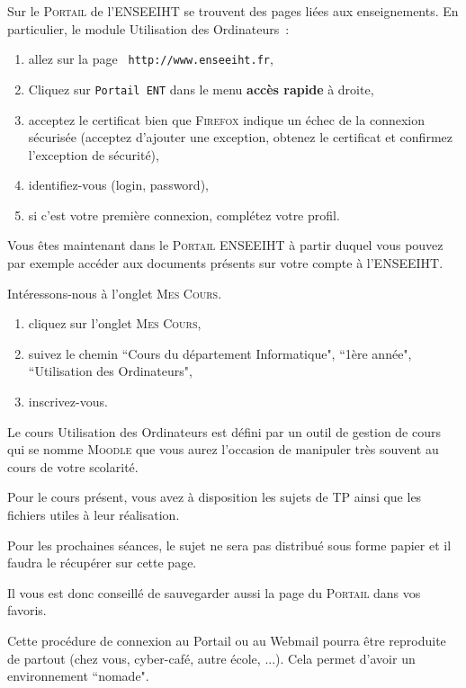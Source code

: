 \documentclass[a4paper,11pt]{article}
\newcommand{\netscape}{\textsc{Firefox}\xspace}
\begin{document}
Sur le \textsc{Portail} de l'ENSEEIHT se trouvent
des pages liées aux enseignements. En particulier, le module Utilisation des
Ordinateurs~:

\begin{enumerate}
  \item allez sur la page \verb+ http://www.enseeiht.fr+,
  \item Cliquez sur \verb+Portail ENT+ dans le menu \textbf{accès rapide} à
        droite,
  \item acceptez le certificat bien que \netscape indique un échec de la
        connexion sécurisée (acceptez d'ajouter une exception, obtenez le
        certificat et confirmez l'exception de sécurité),
  \item identifiez-vous (login, password),
  \item si c'est votre première connexion, complétez votre profil.
\end{enumerate}

Vous êtes maintenant dans le \textsc{Portail ENSEEIHT} à partir duquel vous
pouvez par exemple accéder aux documents présents sur votre compte à
l'ENSEEIHT.

Intéressons-nous à l'onglet \textsc{Mes Cours}.

\begin{enumerate}
  \item cliquez sur l'onglet \textsc{Mes Cours},
  \item suivez le chemin ``Cours du département
        Informatique", ``1ère année", ``Utilisation des Ordinateurs",
  \item inscrivez-vous.
\end{enumerate}

Le cours Utilisation des Ordinateurs  est défini par un outil de gestion de cours qui
se nomme \textsc{Moodle} que vous aurez l'occasion de manipuler très souvent
au cours de votre scolarité.

Pour le cours présent, vous avez à disposition les sujets de TP ainsi que les
fichiers utiles à leur réalisation.

Pour les prochaines séances, le sujet ne sera pas distribué sous forme
papier et il faudra le récupérer sur cette page.

Il vous est donc conseillé de sauvegarder aussi la page du \textsc{Portail}
dans vos favoris.

Cette procédure de connexion au Portail ou au Webmail pourra être reproduite
de partout (chez vous, cyber-café, autre école, ...). Cela permet d'avoir un
environnement ``nomade".
\end{document}
